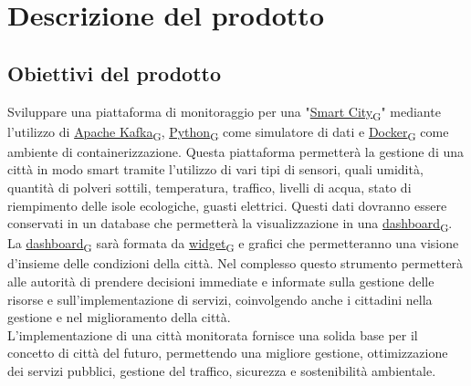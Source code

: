 \section{Descrizione del prodotto}
\subsection{Obiettivi del prodotto}
Sviluppare una piattaforma di monitoraggio per una "\href{https://7last.github.io/docs/rtb/documentazione-interna/glossario\#smart-city}{Smart City\textsubscript{G}}" mediante l'utilizzo di \href{https://7last.github.io/docs/rtb/documentazione-interna/glossario\#apache-kafka}{Apache Kafka\textsubscript{G}}, \href{https://7last.github.io/docs/rtb/documentazione-interna/glossario\#python}{Python\textsubscript{G}} come simulatore di dati e \href{https://7last.github.io/docs/rtb/documentazione-interna/glossario\#docker}{Docker\textsubscript{G}} come ambiente di containerizzazione. Questa piattaforma permetterà la gestione di una città in modo smart tramite l'utilizzo di vari tipi di sensori, quali umidità, quantità di polveri sottili, temperatura, traffico, livelli di acqua, stato di riempimento delle isole ecologiche, guasti elettrici. Questi dati dovranno essere conservati in un database che permetterà la visualizzazione in una \href{https://7last.github.io/docs/rtb/documentazione-interna/glossario\#dashboard}{dashboard\textsubscript{G}}. La \href{https://7last.github.io/docs/rtb/documentazione-interna/glossario\#dashboard}{dashboard\textsubscript{G}} sarà formata da \href{https://7last.github.io/docs/rtb/documentazione-interna/glossario\#widget}{widget\textsubscript{G}} e grafici che permetteranno una visione d'insieme delle condizioni della città. Nel complesso questo strumento permetterà alle autorità di prendere decisioni immediate e informate sulla gestione delle risorse e sull'implementazione di servizi, coinvolgendo anche i cittadini nella gestione e nel miglioramento della città.\\
L'implementazione di una città monitorata fornisce una solida base per il concetto di città del futuro, permettendo una migliore gestione, ottimizzazione dei servizi pubblici, gestione del traffico, sicurezza e sostenibilità ambientale.
